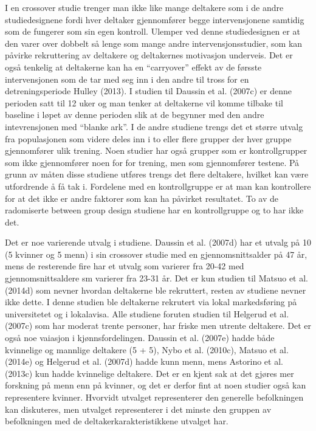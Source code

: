 \documentclass[
  letterpaper,
  DIV=11,
  numbers=noendperiod]{scrartcl}
\begin{document}
I en crossover studie trenger man ikke like mange deltakere som i de
andre studiedesignene fordi hver deltaker gjennomfører begge
intervensjonene samtidig som de fungerer som sin egen kontroll. Ulemper
ved denne studiedesignen er at den varer over dobbelt så lenge som mange
andre intervensjonsstudier, som kan påvirke rekruttering av deltakere og
deltakernes motivasjon underveis. Det er også tenkelig at deltakerne kan
ha en ``carryover'' effekt av de førsste intervensjonen som de tar med
seg inn i den andre til tross for en detreningsperiode Hulley (2013). I
studien til Daussin et al. (2007c) er denne perioden satt til 12 uker og
man tenker at deltakerne vil komme tilbake til baseline i løpet av denne
perioden slik at de begynner med den andre intevrensjonen med ``blanke
ark''. I de andre studiene trengs det et større utvalg fra populasjonen
som videre deles inn i to eller flere grupper der hver gruppe
gjennomfører ulik trening. Noen studier har også grupper som er
kontrollgrupper som ikke gjennomfører noen for for trening, men som
gjennomfører testene. På grunn av måten disse studiene utføres trengs
det flere deltakere, hvilket kan være utfordrende å få tak i. Fordelene
med en kontrollgruppe er at man kan kontrollere for at det ikke er andre
faktorer som kan ha påvirket resultatet. To av de radomiserte between
group design studiene har en kontrollgruppe og to har ikke det.

Det er noe varierende utvalg i studiene. Daussin et al. (2007d) har et
utvalg på 10 (5 kvinner og 5 menn) i sin crossover studie med en
gjennomsnittsalder på 47 år, mens de resterende fire har et utvalg som
varierer fra 20-42 med gjennomsnittsaldere sm varierer fra 23-31 år. Det
er kun studien til Matsuo et al. (2014d) som nevner hvordan deltakerne
ble rekruttert, resten av studiene nevner ikke dette. I denne studien
ble deltakerne rekrutert via lokal markedsføring på universitetet og i
lokalavisa. Alle studiene foruten studien til Helgerud et al. (2007c)
som har moderat trente personer, har friske men utrente deltakere. Det
er også noe vaiasjon i kjønnsfordelingen. Daussin et al. (2007e) hadde
både kvinnelige og mannlige deltakere (5 + 5), Nybo et al. (2010c),
Matsuo et al. (2014e) og Helgerud et al. (2007d) hadde kunn menn, mens
Astorino et al. (2013c) kun hadde kvinnelige deltakere. Det er en kjent
sak at det gjøres mer forskning på menn enn på kvinner, og det er derfor
fint at noen studier også kan representere kvinner. Hvorvidt utvalget
representerer den generelle befolkningen kan diskuteres, men utvalget
representerer i det minste den gruppen av befolkningen med de
deltakerkarakteristikkene utvalget har.
\end{document}

